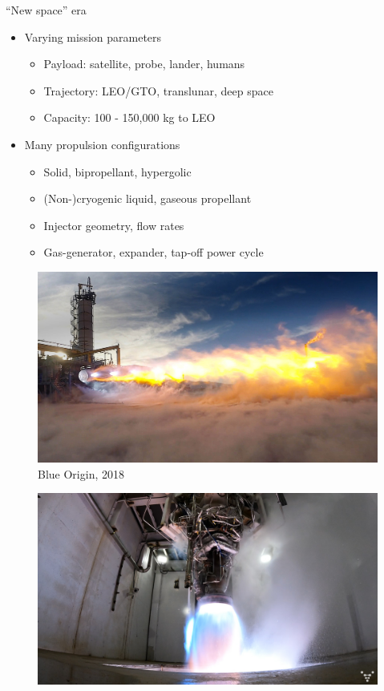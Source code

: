 \documentclass[]{beamer}
\begin{document}
\begin{frame}{``New space'' era}
    \begin{itemize}
        \item Varying mission parameters
        \begin{itemize}
            \item Payload: satellite, probe, lander, humans
            \item Trajectory: LEO/GTO, translunar, deep space
            \item Capacity: 100 - 150,000 kg to LEO
        \end{itemize}  
        \item Many propulsion configurations
        \begin{itemize}
            \item Solid, bipropellant, hypergolic
            \item (Non-)cryogenic liquid, gaseous propellant 
            \item Injector geometry, flow rates
            \item Gas-generator, expander, tap-off power cycle
        \end{itemize}
    \end{itemize}
	\begin{minipage}{0.33\linewidth}
		\begin{figure}
			\includegraphics[width=0.99\linewidth]{intro/be4.jpg}
			\caption*{\tiny{Blue Origin, 2018}}
		\end{figure}
	\end{minipage}
	\begin{minipage}{0.33\linewidth}
		\begin{figure}
			\includegraphics[width=0.99\linewidth]{intro/aeonR.png}

\end{figure}
\end{minipage}
\end{frame}
\end{document}
